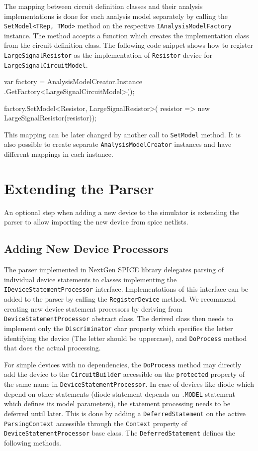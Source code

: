 The mapping between circuit definition classes and their analysis implementations is done for each analysis model separately by calling the \texttt{SetModel<TRep, TMod>} method on the respective \texttt{IAnalysis\+ModelFactory} instance. The method accepts a function which creates the implementation class from the circuit definition class. The following code snippet shows how to register \texttt{LargeSignal\+Resistor} as the implementation of \texttt{Resistor} device for \texttt{LargeSignalCircuit\+Model}.

\begin{csharpcode}
var factory = AnalysisModelCreator.Instance
	.GetFactory<LargeSignalCircuitModel>();

factory.SetModel<Resistor, LargeSignalResistor>(
	resistor => new LargeSignalResistor(resistor));
\end{csharpcode}

This mapping can be later changed by another call to \texttt{SetModel} method. It is also possible to create separate \texttt{AnalysisModelCreator} instances and have different mappings in each instance.

\section{Extending the Parser}

An optional step when adding a new device to the simulator is extending the parser to allow importing the new device from spice netlists.

\subsection{Adding New Device Processors}

The parser implemented in NextGen SPICE library delegates parsing of individual device statements to classes implementing the \texttt{IDeviceStatementProcessor} interface. Implementations of this interface can be added to the parser by calling the \texttt{RegisterDevice} method. We recommend creating new device statement processors by deriving from \texttt{DeviceStatementProcessor} abstract class. The derived class then needs to implement only the \texttt{Discriminator} char property which specifies the letter identifying the device (The letter should be uppercase), and \texttt{DoProcess} method that does the actual processing.

For simple devices with no dependencies, the \texttt{DoProcess} method may directly add the device to the \texttt{CircuitBuilder} accessible on the \texttt{protected} property of the same name in \texttt{DeviceStatementProcessor}. In case of devices like diode which depend on other statements (diode statement depends on \texttt{.MODEL} statement which defines its model parameters), the statement processing needs to be deferred until later. This is done by adding a \texttt{DeferredStatement} on the active \texttt{ParsingContext} accessible through the \texttt{Context} property of \texttt{DeviceStatement\+Processor} base class. The \texttt{DeferredStatement} defines the following methods.

